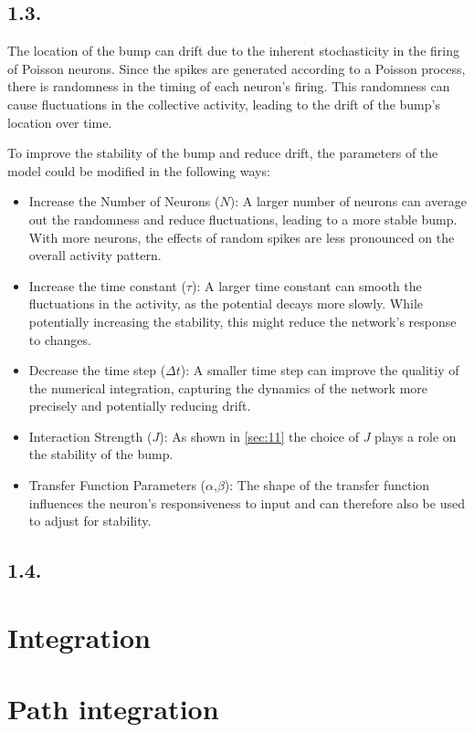 \documentclass{article}
\begin{document}
\subsection*{1.3.}
The location of the bump can drift due to the inherent stochasticity in the firing of Poisson neurons. Since the spikes are generated according to a Poisson process, there is randomness in the timing of each neuron's firing. This randomness can cause fluctuations in the collective activity, leading to the drift of the bump's location over time.

To improve the stability of the bump and reduce drift, the parameters of the model could be modified in the following ways:
\begin{itemize}
    \item Increase the Number of Neurons (\(N\)): A larger number of neurons can average out the randomness and reduce fluctuations, leading to a more stable bump. With more neurons, the effects of random spikes are less pronounced on the overall activity pattern.
    \item Increase the time constant (\(\tau\)): A larger time constant can smooth the fluctuations in the activity, as the potential decays more slowly. While potentially increasing the stability, this might reduce the network's response to changes.
    \item Decrease the time step (\(\Delta t\)): A smaller time step can improve the qualitiy of the numerical integration, capturing the dynamics of the network more precisely and potentially reducing drift.
    \item Interaction Strength (\(J\)): As shown in \cref{sec:11} the choice of \(J\) plays a role on the stability of the bump.
    \item Transfer Function Parameters (\(\alpha\),\(\beta\)): The shape of the transfer function influences the neuron's responsiveness to input and can therefore also be used to adjust for stability.
\end{itemize}

\subsection*{1.4.}


\section{Integration}

\section{Path integration}
\end{document}
